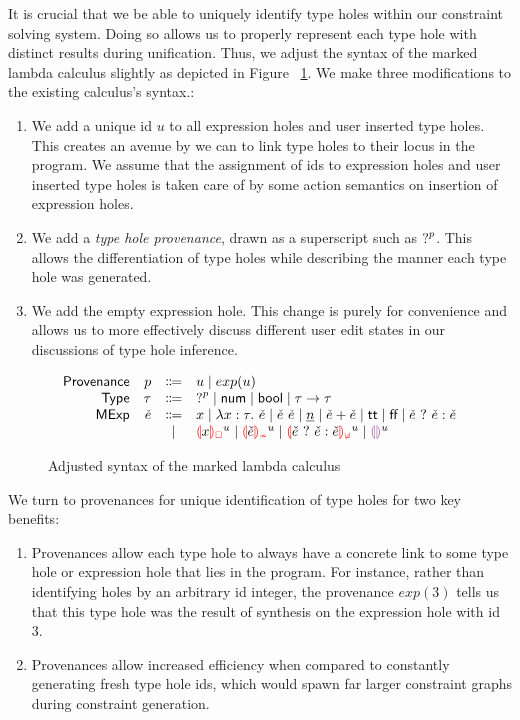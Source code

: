 \label{sec:typinf}
It is crucial that we be able to uniquely identify type holes within our constraint solving system. Doing so allows us to properly represent each type hole with distinct results during unification. Thus, we adjust the syntax of the marked lambda calculus slightly as depicted in Figure ~\ref{fig:adjusted-calculus-syntax}. We make three modifications to the existing calculus's syntax.:
\begin{enumerate}
    \item We add a unique id $u$ to all expression holes and user inserted type holes. This creates an avenue by we can to link type holes to their locus in the program. We assume that the assignment of ids to expression holes and user inserted type holes is taken care of by some action semantics on insertion of expression holes. 
    \item We add a \emph{type hole provenance}, drawn as a superscript such as $\mathtt{?}^p$. This allows the differentiation of type holes while describing the manner each type hole was generated.
    \item We add the empty expression hole. This change is purely for convenience and allows us to more effectively discuss different user edit states in our discussions of type hole inference.
\end{enumerate}

\begin{figure}[htbp]
  \[\begin{array}{rrcl}
    \Prov & \Provp & \Coloneqq & u \mid exp(u) \\
    \TMName  & \TMV  & \Coloneqq & \TUnknown^{p} \mid \TNum \mid \TBool \mid \TArrow{\TMV}{\TMV} \\
    \ECMName & \ECMV & \Coloneqq & x \mid \ECLam{x}{\TMV}{\ECMV} \mid \ECAp{\ECMV}{\ECMV}
                       \mid           \ECNumMV \mid \ECPlus{\ECMV}{\ECMV}
                       \mid           \ECTrue \mid \ECFalse \mid \ECIf{\ECMV}{\ECMV}{\ECMV} \\
             &       & \mid         & \ECUnbound{x}^u \mid \ECInconType{\ECMV}^u \mid \ECInconBr{\ECMV}{\ECMV}{\ECMV}^u \mid \EEHole^u
  \end{array}\]
  \caption{Adjusted syntax of the marked lambda calculus}
  \label{fig:adjusted-calculus-syntax}
\end{figure}

We turn to provenances for unique identification of type holes for two key benefits:
\begin{enumerate}
    \item Provenances allow each type hole to always have a concrete link to some type hole or expression hole that lies in the program. For instance, rather than identifying holes by an arbitrary id integer, the provenance $exp(3)$ tells us that this type hole was the result of synthesis on the expression hole with id 3.
    \item Provenances allow increased efficiency when compared to constantly generating fresh type hole ids, which would spawn far larger constraint graphs during constraint generation.
\end{enumerate}

